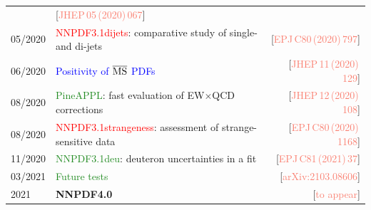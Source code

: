 \documentclass{beamer}
\begin{document}
\begin{frame}
\begin{tabularx}{\textwidth}{lXr}
          & {\tiny{[{\textcolor{salmon}{JHEP\,05\,(2020)\,067}}]}}\\
  05/2020 & \textcolor{red}{NNPDF3.1dijets}: {\scriptsize comparative study of single- and di-jets}                                             
          & {\tiny{[{\textcolor{salmon}{EPJ\,C80\,(2020)\,797}}]}}\\
  06/2020 & \textcolor{blue}{Positivity of $\overline{\rm MS}$ PDFs}                    
          & {\tiny{[{\textcolor{salmon}{JHEP\,11\,(2020)\,129}}]}}\\
  08/2020 & \textcolor{forestgreen}{PineAPPL}: {\scriptsize fast evaluation of EW$\times$QCD corrections}                                           
          & {\tiny{[{\textcolor{salmon}{JHEP\,12\,(2020)\,108}}]}}\\
  08/2020 & \textcolor{red}{NNPDF3.1strangeness}: {\scriptsize assessment of strange-sensitive data}                                        
          & {\tiny{[{\textcolor{salmon}{EPJ\,C80\,(2020)\,1168}}]}}\\
  11/2020 & \textcolor{forestgreen}{NNPDF3.1deu}: {\scriptsize deuteron uncertainties in a fit}                                        
          & {\tiny{[{\textcolor{salmon}{EPJ\,C81\,(2021)\,37}}]}}\\
  03/2021 & \textcolor{forestgreen}{Future tests}                                       
          & {\tiny{[{\textcolor{salmon}{arXiv:2103.08606}}]}}\\
  2021    & {\bf NNPDF4.0}                                                              
          & {\tiny{[{\textcolor{salmon}{to appear}}]}}\\
 \end{tabularx}
\end{frame}
\end{document}
